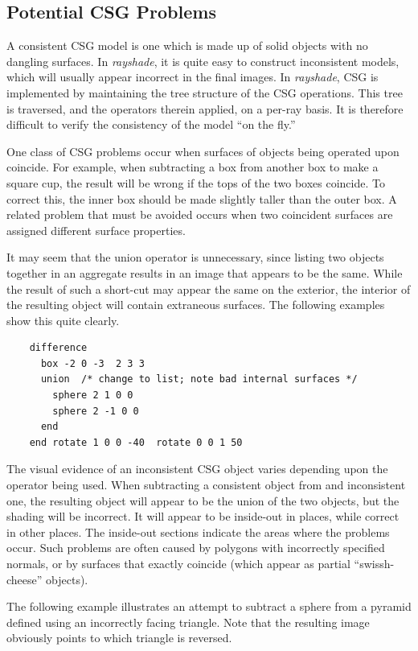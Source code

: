 \subsection{Potential CSG Problems}

A consistent CSG model is one which is made
up of solid objects with no dangling surfaces.  In {\em rayshade},
it is quite easy to construct inconsistent models, which will usually
appear incorrect in the final images.
In {\em rayshade}, CSG is implemented by maintaining
the tree structure of the CSG operations.  This tree is traversed,
and the operators therein applied, on a per-ray basis.
It is therefore difficult to verify the consistency of
the model ``on the fly.''

One class of CSG problems occur when
surfaces of objects being operated upon
coincide.  For example, when subtracting a box from another box to make a
square cup, the result will be wrong if the tops of the two boxes
coincide.  To correct this, the inner box should be made
slightly taller than the outer box.
A related problem that must be
avoided occurs when two coincident surfaces are assigned
different surface properties.

It may seem that the union operator is unnecessary, since
listing two objects together in an aggregate results
in an image that appears to be the same.
While the result of such a short-cut
may appear the same on the exterior, the interior
of the resulting object will contain
extraneous surfaces.
The following examples show this quite clearly.

\begin{verbatim}
    difference
      box -2 0 -3  2 3 3
      union  /* change to list; note bad internal surfaces */
        sphere 2 1 0 0
        sphere 2 -1 0 0
      end
    end rotate 1 0 0 -40  rotate 0 0 1 50
\end{verbatim}

The visual evidence of an inconsistent CSG object varies depending
upon the operator being used.
When subtracting a consistent object from and
inconsistent one, the resulting object will appear to be
the union of the two objects, but the shading will be incorrect.
It will appear to be inside-out in places, while correct
in other places.  The inside-out sections indicate the areas
where the problems occur.
Such problems are often caused by
polygons with incorrectly specified
normals, or by surfaces that exactly coincide (which
appear as partial ``swissh-cheese'' objects).

The following example illustrates an attempt to subtract a sphere from
a pyramid defined using an incorrectly facing triangle.  Note
that the resulting image obviously points to which triangle is
reversed.

